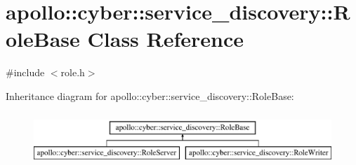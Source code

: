 \hypertarget{classapollo_1_1cyber_1_1service__discovery_1_1RoleBase}{\section{apollo\-:\-:cyber\-:\-:service\-\_\-discovery\-:\-:Role\-Base Class Reference}
\label{classapollo_1_1cyber_1_1service__discovery_1_1RoleBase}
}


{\ttfamily \#include $<$role.\-h$>$}

Inheritance diagram for apollo\-:\-:cyber\-:\-:service\-\_\-discovery\-:\-:Role\-Base\-:\begin{figure}[H]
\begin{center}
\leavevmode
\includegraphics[height=2.000000cm]{classapollo_1_1cyber_1_1service__discovery_1_1RoleBase}
\end{center}
\end{figure}
